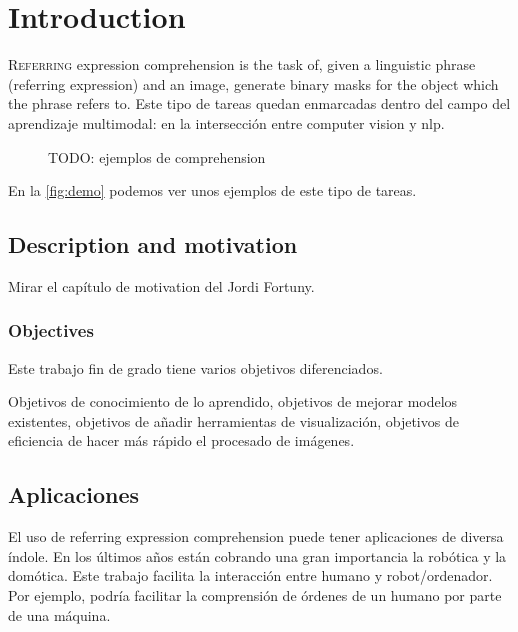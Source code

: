 

\chapter{Introduction} \label{cha:intro}



\lettrine{R}{eferring} expression comprehension is the task of, given a
linguistic phrase (referring expression) and an image, generate binary masks
for the object which the phrase refers to. Este tipo de tareas quedan
enmarcadas dentro del campo del aprendizaje multimodal: en la intersección
entre computer vision y \gls{nlp}.

\begin{figure}[ht]
  \centering
  \caption[Examples of \acl*{rec}]{TODO: ejemplos de comprehension}
  \label{fig:demo}
\end{figure}

En la \vref{fig:demo} podemos ver unos ejemplos de este tipo de tareas.


\section{Description and motivation}

Mirar el capítulo de motivation del Jordi Fortuny.

\subsection{Objectives}

Este trabajo fin de grado tiene varios objetivos diferenciados.

Objetivos de conocimiento de lo aprendido, objetivos de mejorar modelos
existentes, objetivos de añadir herramientas de visualización, objetivos de
eficiencia de hacer más rápido el procesado de imágenes.


\section{Aplicaciones}

El uso de referring expression comprehension puede tener aplicaciones de
diversa índole. En los últimos años están cobrando una gran importancia la
robótica y la domótica. Este trabajo facilita la interacción entre humano y
robot/ordenador. Por ejemplo, podría facilitar la comprensión de órdenes de un
humano por parte de una máquina.

